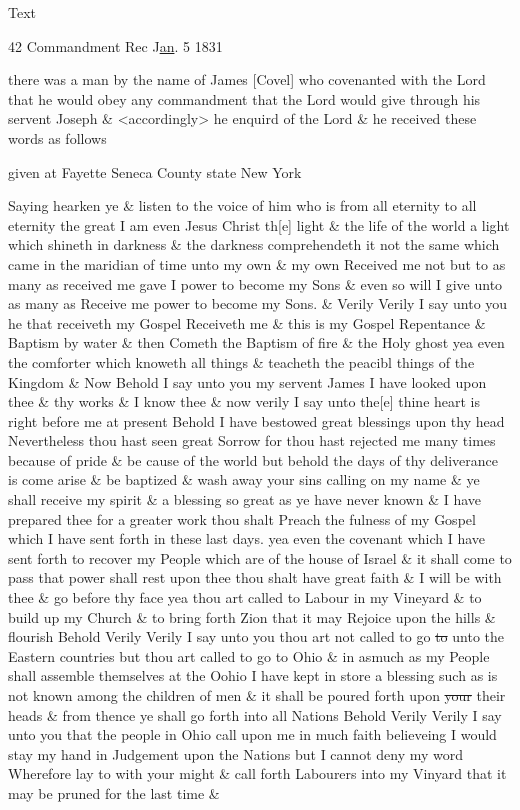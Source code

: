 			\begin{description}
				\item[Text]
			\end{description}
				
				\begin{tightcenter}
				42 Commandment Rec J\uline{an}. 5 1831
				\end{tightcenter}
				
				there was a man by the name of James [Covel] who covenanted with the Lord that he would obey any commandment that the Lord would give through his servent Joseph \& <accordingly> he enquird of the Lord \& he received these words as follows
				
				given at Fayette Seneca County state New York
				
				Saying hearken ye \& listen to the voice of him who is from all eternity to all eternity the great I am even Jesus Christ th[e] light \& the life of the world a light which shineth in darkness \& the darkness comprehendeth it not the same which came in the maridian of time unto my own \& my own Received me not but to as many as received me gave I power to become my Sons \& even so will I give unto as many as Receive me power to become my Sons. \& Verily Verily I say unto you he that receiveth my Gospel Receiveth me \& this is my Gospel Repentance \& Baptism by water \& then Cometh the Baptism of fire \& the Holy ghost yea even the comforter which knoweth all things \& teacheth the peacibl things of the Kingdom \& Now Behold I say unto you my servent James I have looked upon thee \& thy works \& I know thee \& now verily I say unto the[e] thine heart is right before me at present Behold I have bestowed great blessings upon thy head Nevertheless thou hast seen great Sorrow for thou hast rejected me many times because of pride \& be cause of the world but behold the days of thy deliverance is come arise \& be baptized \& wash away your sins calling on my name \& ye shall receive my spirit \& a blessing so great as ye have never known \& I have prepared thee for a greater work thou shalt Preach the fulness of my Gospel which I have sent forth in these last days. yea even the covenant which I have sent forth to recover my People which are of the house of Israel \& it shall come to pass that power shall rest upon thee thou shalt have great faith \& I will be with thee \& go before thy face yea thou art called to Labour in my Vineyard \& to build up my Church \& to bring forth Zion that it may Rejoice upon the hills \& flourish Behold Verily Verily I say unto you thou art not called to go \sout{to} unto the Eastern countries but thou art called to go to Ohio \& in asmuch as my People shall assemble themselves at the Oohio I have kept in store a blessing such as is not known among the children of men \& it shall be poured forth upon \sout{your} their heads \& from thence ye shall go forth into all Nations Behold Verily Verily I say unto you that the people in Ohio call upon me in much faith believeing I would stay my hand in Judgement upon the Nations but I cannot deny my word Wherefore lay to with your might \& call forth Labourers into my Vinyard that it may be pruned for the last time \& 